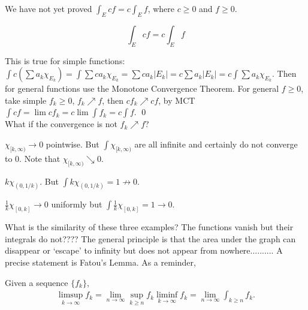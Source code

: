 






We have not yet proved $\int_E cf = c \int_E f$, where $c \geq 0$ and $f \geq 0$.

\begin{prop}
\[ \int_E cf = c \int_E f \]
\end{prop}

\pf This is true for simple functions: $\int c (\sum a_k \chi_{E_k})= \int \sum c a_k \chi_{E_k} = \sum c a_k |E_k| = c \sum a_k |E_k| = c \int \sum a_k \chi_{E_k}$. Then for general functions use the Monotone Convergence Theorem. For general $f \geq 0$, take simple $f_k \geq 0$, $f_k \nearrow f$, then $c f_k \nearrow cf$, by MCT $\int cf= \lim cf_k = c \lim \int f_k = c \int f$. \qed \\


What if the convergence is not $f_k \nearrow f$? 

\begin{ex}
$\chi_{[k,\infty)} \to 0$ pointwise. But $\int \chi_{[k,\infty)}$ are all infinite and certainly do not converge to $0$. Note that $\chi_{[k,\infty)} \searrow 0$. 
\end{ex}


\begin{ex}
$k \chi_{(0,1/k)}$. But $\int k \chi_{(0,1/k)} =1 \not\to 0$. 

\end{ex}


\begin{ex}
$\frac{1}{k} \chi_{[0,k]} \to 0$ uniformly but $\int \frac{1}{k} \chi_{[0,k]}= 1 \to 0$. 

\end{ex}


What is the similarity of these three examples? The functions vanish but their integrals do not???? The general principle is that the area under the graph can disappear or `escape' to infinity but does not appear from nowhere.......... A precise statement is Fatou's Lemma. As a reminder,


\begin{dfn}
Given a sequence $\{f_k\}$,
	\[
	\begin{split}
	\limsup_{k \to \infty} f_k = \lim_{n \to \infty} \sup_{k \geq n} f_k
	\liminf_{k \to \infty} f_k = \lim_{n \to \infty} \int_{k \geq n} f_k.
	\end{split}
	\]
\end{dfn}


